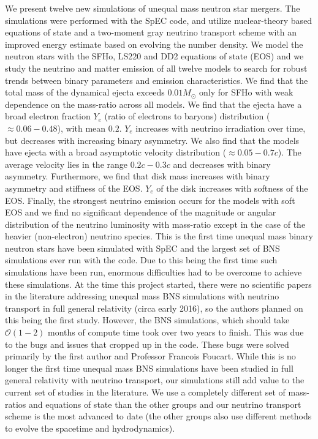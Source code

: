 We present twelve new simulations of unequal mass neutron star mergers. The simulations were performed with the SpEC code, and utilize nuclear-theory based equations of state and a two-moment gray neutrino transport scheme with an improved energy estimate based on evolving the number density. We model the neutron stars with the SFHo, LS220 and DD2 equations of state (EOS) and we study the neutrino and matter emission of all twelve models to search for robust trends between binary parameters and emission characteristics. We find that the total mass of the dynamical ejecta exceeds $0.01M_\odot$ only for SFHo with weak dependence on the mass-ratio across all models.  We find that the  ejecta have a broad electron fraction $Y_e$ (ratio of electrons to baryons) distribution ($\approx 0.06-0.48$), with mean $0.2$. $Y_e$ increases with neutrino irradiation over time, but decreases with increasing binary asymmetry. We also find that the models have ejecta with a broad asymptotic velocity distribution ($\approx 0.05-0.7c$). The average velocity lies in the range $0.2c - 0.3c$ and decreases with binary asymmetry. Furthermore, we find that disk mass increases with binary asymmetry and stiffness of the EOS. $Y_e$ of the disk increases with softness of the EOS. Finally, the strongest neutrino emission occurs for the models with soft EOS and we find no significant dependence of the magnitude or angular distribution of the neutrino luminosity with mass-ratio except in the case of the heavier (non-electron) neutrino species. This is the first time unequal mass binary neutron stars have been simulated with SpEC and the largest set of BNS simulations ever run with the code. Due to this being the first time such simulations have been run, enormous difficulties had to be overcome to achieve these simulations. At the time this project started, there were no scientific papers in the literature addressing unequal mass BNS simulations with neutrino transport in full general relativity (circa early 2016), so the authors planned on this being the first study. However, the BNS simulations, which should take $\mathcal{O}(1-2)$ months of compute time took over two years to finish. This was due to the bugs and issues that cropped up in the code. These bugs were solved primarily by the first author and Professor Francois Foucart. While this is no longer the first time unequal mass BNS simulations have been studied in full general relativity with neutrino transport, our simulations still add value to the current set of studies in the literature. We use a completely different set of mass-ratios and equations of state than the other groups and our neutrino transport scheme is the most advanced to date (the other groups also use different methods to evolve the spacetime and hydrodynamics).

